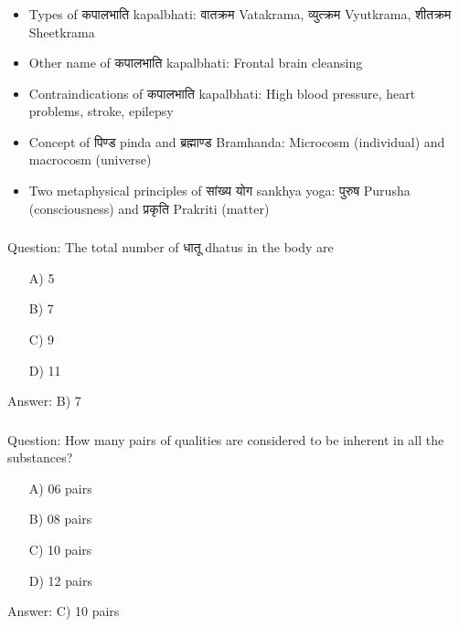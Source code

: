 \begin{frame}[fragile]\frametitle{}
\begin{itemize}
\item Types of कपालभाति kapalbhati: वातक्रम Vatakrama, व्युत्क्रम Vyutkrama, शीतक्रम Sheetkrama
\item Other name of कपालभाति kapalbhati: Frontal brain cleansing
\item Contraindications of कपालभाति kapalbhati: High blood pressure, heart problems, stroke, epilepsy
\item Concept of पिण्ड pinda and ब्रह्माण्ड Bramhanda: Microcosm (individual) and macrocosm (universe)
\item Two metaphysical principles of सांख्य योग sankhya yoga: पुरुष Purusha (consciousness) and प्रकृति Prakriti (matter)
\end{itemize}
\end{frame}

\begin{frame}[fragile]\frametitle{}

Question: The total number of धातू dhatus in the body are

\begin{itemize}
\item[A)] 5
\item[B)] 7
\item[C)] 9
\item[D)] 11
\end{itemize}

Answer: B) 7
\end{frame}

\begin{frame}[fragile]\frametitle{}

Question: How many pairs of qualities are considered to be inherent in all the substances?

\begin{itemize}
\item[A)] 06 pairs
\item[B)] 08 pairs
\item[C)] 10 pairs
\item[D)] 12 pairs
\end{itemize}

Answer: C) 10 pairs
\end{frame}

